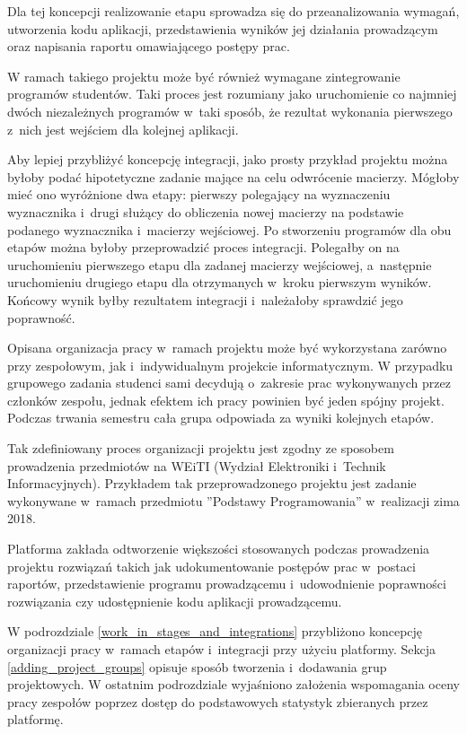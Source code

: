 Dla tej koncepcji realizowanie etapu sprowadza się do przeanalizowania wymagań, utworzenia kodu aplikacji, przedstawienia wyników jej działania prowadzącym oraz napisania raportu omawiającego postępy prac.

W ramach takiego projektu może być również wymagane zintegrowanie programów studentów.
Taki proces jest rozumiany jako uruchomienie co najmniej dwóch niezależnych programów w~taki sposób, że rezultat wykonania pierwszego z~nich jest wejściem dla kolejnej aplikacji.

Aby lepiej przybliżyć koncepcję integracji, jako prosty przykład projektu można byłoby podać hipotetyczne zadanie mające na celu odwrócenie macierzy.
Mógłoby mieć ono wyróżnione dwa etapy: pierwszy polegający na wyznaczeniu wyznacznika i~drugi służący do obliczenia nowej macierzy na podstawie podanego wyznacznika i~macierzy wejściowej.
Po stworzeniu programów dla obu etapów można byłoby przeprowadzić proces integracji.
Polegałby on na uruchomieniu pierwszego etapu dla zadanej macierzy wejściowej, a~następnie uruchomieniu drugiego etapu dla otrzymanych w~kroku pierwszym wyników.
Końcowy wynik byłby rezultatem integracji i~należałoby sprawdzić jego poprawność.

Opisana organizacja pracy w~ramach projektu może być wykorzystana zarówno przy zespołowym, jak i~indywidualnym projekcie informatycznym.
W przypadku grupowego zadania studenci sami decydują o~zakresie prac wykonywanych przez członków zespołu, jednak efektem ich pracy powinien być jeden spójny projekt.
Podczas trwania semestru cała grupa odpowiada za wyniki kolejnych etapów.

Tak zdefiniowany proces organizacji projektu jest zgodny ze sposobem prowadzenia przedmiotów na WEiTI (Wydział Elektroniki i~Technik Informacyjnych).
Przykładem tak przeprowadzonego projektu jest zadanie wykonywane w~ramach przedmiotu ”Podstawy Programowania” w~realizacji zima 2018.

Platforma zakłada odtworzenie większości stosowanych podczas prowadzenia projektu rozwiązań takich jak udokumentowanie postępów prac w~postaci raportów, przedstawienie programu prowadzącemu i~udowodnienie poprawności rozwiązania czy udostępnienie kodu aplikacji prowadzącemu.

W podrozdziale \ref{work_in_stages_and_integrations} przybliżono koncepcję organizacji pracy w~ramach etapów i~integracji przy użyciu platformy.
Sekcja \ref{adding_project_groups} opisuje sposób tworzenia i~dodawania grup projektowych.
W ostatnim podrozdziale wyjaśniono założenia wspomagania oceny pracy zespołów poprzez dostęp do podstawowych statystyk zbieranych przez platformę.


